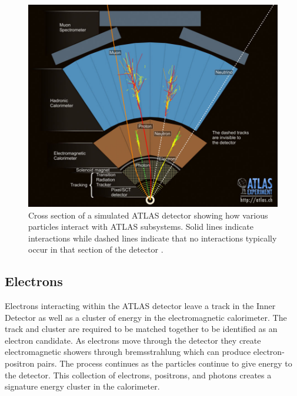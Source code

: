 \begin{figure}[h]
	\centering
	\includegraphics[width=\columnwidth]{../ThesisImages/Simulation/ParticleInteractions.jpg}
	\caption[Cross section of a simulated ATLAS detector showing how various particles interact with ATLAS subsystems.]{Cross section of a simulated ATLAS detector showing how various particles interact with ATLAS subsystems.  Solid lines indicate interactions while dashed lines indicate that no interactions typically occur in that section of the detector \cite{ParticleInteractions}.
	}
	\label{fig:ATLASInteractions}
\end{figure}


\subsection{Electrons}
Electrons interacting within the ATLAS detector leave a track in the Inner Detector as well as a cluster of energy in the electromagnetic calorimeter.  The track and cluster are required to be matched together to be identified as an electron candidate\cite{ElectronID}.  As electrons move through the detector they create electromagnetic showers through bremsstrahlung which can produce electron-positron pairs.  The process continues as the particles continue to give energy to the detector.  This collection of electrons, positrons, and photons creates a signature energy cluster in the calorimeter.  

